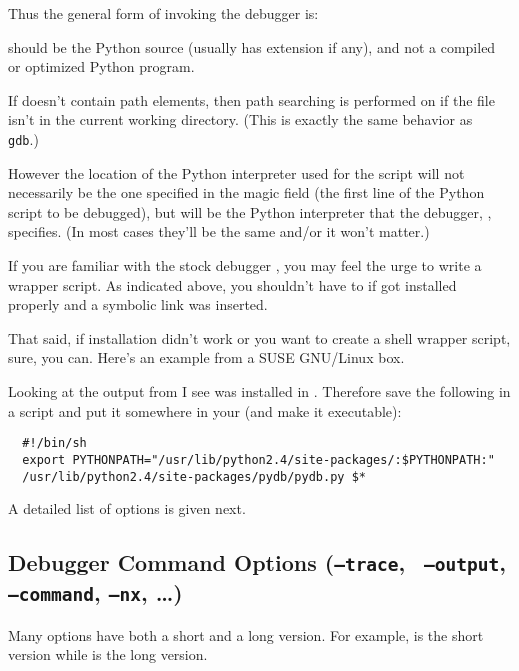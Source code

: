 Thus the general form of invoking the debugger is:

 

 should be the Python source (usually has extension
 if any), and not a compiled or optimized Python program.

If  doesn't contain path elements, then path
searching is performed on  if the file isn't in the
current working directory. (This is exactly the same behavior as {\tt
gdb}.)

However the location of the Python interpreter used for the script
will not necessarily be the one specified in the magic field (the
first line of the Python script to be debugged), but will be the
Python interpreter that the debugger, , specifies. (In most
cases they'll be the same and/or it won't matter.)

If you are familiar with the stock debugger , you may feel
the urge to write a wrapper script. As indicated above, you shouldn't
have to if  got installed properly and a symbolic link was
inserted.

That said, if installation didn't work or you want to create a shell
wrapper script, sure, you can. Here's an example from a SUSE GNU/Linux
box.

Looking at the output from  I see  was
installed in . Therefore save
the following in a script and put it somewhere in your 
(and make it executable):

\begin{verbatim}
  #!/bin/sh
  export PYTHONPATH="/usr/lib/python2.4/site-packages/:$PYTHONPATH:"
  /usr/lib/python2.4/site-packages/pydb/pydb.py $*
\end{verbatim}

A detailed list of options is given next. 

\subsection{Debugger Command Options ({\tt --trace}, {\tt
    --output}, {\tt --command}, {\tt --nx}, \ldots)\label{subsection-switches}}

Many options have both a short and a long version. For example,
 is the short version while  is the long
version.

